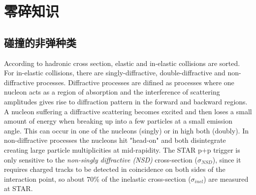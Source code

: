  \chapter{零碎知识}

\section{碰撞的非弹种类}
According to hadronic cross section, elastic and in-elastic collisions are sorted.
For in-elastic collisions, there are singly-diffractive, double-diffractive and non-diffractive processes.
 Diffractive processes are difined as processes where one nucleon acts as a region of absorption and the interference of scattering amplitudes gives rise to diffraction pattern in the forward and backward regions. A nucleon suffering a diffractive scattering becomes excited and then loses a small amount of energy when breaking up into a few particles at a small emission angle. This can occur in one of the nucleons (singly) or in high both (doubly). In non-diffractive processes the nucleons hit "head-on" and both disintegrate creating large particle multiplicities at mid-rapidity. The STAR p$+$p trigger is only sensitive to the \textit{non-singly diffractive (NSD)} cross-section ($\sigma_{NSD}$), since it requires charged tracks to be detected in coincidence on both sides of the interaction point, so about 70\% of the inelastic cross-section ($\sigma_{inel}$) are measured at STAR.

